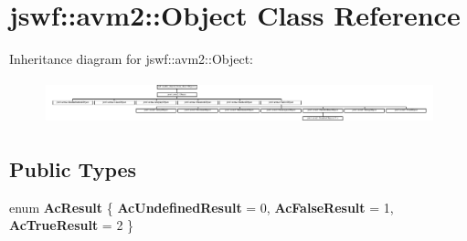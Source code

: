 \hypertarget{classjswf_1_1avm2_1_1_object}{\section{jswf\+:\+:avm2\+:\+:Object Class Reference}
\label{classjswf_1_1avm2_1_1_object}
}
Inheritance diagram for jswf\+:\+:avm2\+:\+:Object\+:\begin{figure}[H]
\begin{center}
\leavevmode
\includegraphics[height=1.269841cm]{classjswf_1_1avm2_1_1_object}
\end{center}
\end{figure}
\subsection*{Public Types}
\begin{DoxyCompactItemize}
\item 
\hypertarget{classjswf_1_1avm2_1_1_object_a5a091b9c7f6a6618eafca72f20687c77}{enum {\bfseries Ac\+Result} \{ {\bfseries Ac\+Undefined\+Result} = 0, 
{\bfseries Ac\+False\+Result} = 1, 
{\bfseries Ac\+True\+Result} = 2
 \}}\label{classjswf_1_1avm2_1_1_object_a5a091b9c7f6a6618eafca72f20687c77}

\end{DoxyCompactItemize}
